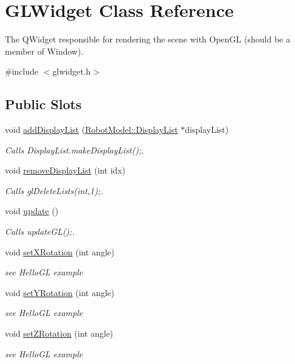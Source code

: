 \hypertarget{class_g_l_widget}{
\section{GLWidget Class Reference}
\label{class_g_l_widget}
}


The QWidget responsible for rendering the scene with OpenGL (should be a member of Window).  


{\ttfamily \#include $<$glwidget.h$>$}\subsection*{Public Slots}
\begin{DoxyCompactItemize}
\item 
void \hyperlink{class_g_l_widget_acd20f92385f2b2190ca708a57d3c3c42}{addDisplayList} (\hyperlink{class_robot_model_1_1_display_list}{RobotModel::DisplayList} $\ast$displayList)
\begin{DoxyCompactList}\small\item\em Calls DisplayList.makeDisplayList();. \item\end{DoxyCompactList}\item 
void \hyperlink{class_g_l_widget_a8b370af6f9b50bb5ae868664fd94eae6}{removeDisplayList} (int idx)
\begin{DoxyCompactList}\small\item\em Calls glDeleteLists(int,1);. \item\end{DoxyCompactList}\item 
void \hyperlink{class_g_l_widget_a6c9d382ddf46097bccb2b69410f7563e}{update} ()
\begin{DoxyCompactList}\small\item\em Calls updateGL();. \item\end{DoxyCompactList}\item 
void \hyperlink{class_g_l_widget_a7083404e9ab8feffb2c486f7c15308ce}{setXRotation} (int angle)
\begin{DoxyCompactList}\small\item\em see HelloGL example \item\end{DoxyCompactList}\item 
void \hyperlink{class_g_l_widget_a29012eba3cb4201f78807066f2c9dcd4}{setYRotation} (int angle)
\begin{DoxyCompactList}\small\item\em see HelloGL example \item\end{DoxyCompactList}\item 
void \hyperlink{class_g_l_widget_a6f6b4fbbcc566d999db7e53aadeba889}{setZRotation} (int angle)
\begin{DoxyCompactList}\small\item\em see HelloGL example \item\end{DoxyCompactList}\end{DoxyCompactItemize}
